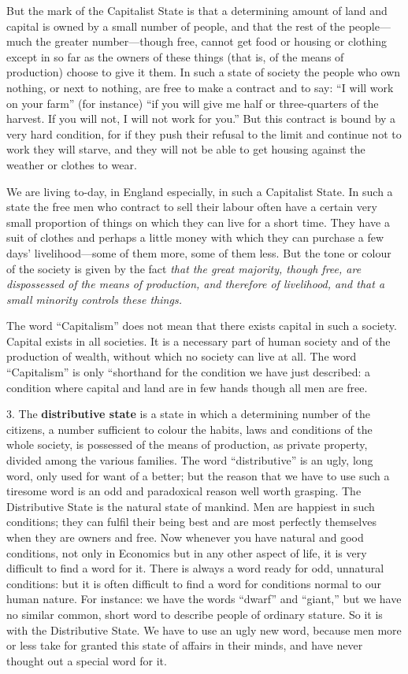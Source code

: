 \documentclass{book}
\begin{document}
But the mark of the Capitalist State is that a determining amount of land and capital is owned by a small number of people, and that the rest of the people—much the greater number—though free, cannot get food or housing or clothing except in so far as the owners of these things (that is, of the means of production) choose to give it them. In such a state of society the people who own nothing, or next to nothing, are free to make a contract and to say: “I will work on your farm” (for instance) “if you will give me half or three-quarters of the harvest. If you will not, I will not work for you.” But this contract is bound by a very hard condition, for if they push their refusal to the limit and continue not to work they will starve, and they will not be able to get housing against the weather or clothes to wear.

We are living to-day, in England especially, in such a Capitalist State. In such a state the free men who contract to sell their labour often have a certain very small proportion of things on which they can live for a short time. They have a suit of clothes and perhaps a little money with which they can purchase a few days’ livelihood—some of them more, some of them less. But the tone or colour of the society is given by the fact \emph{that the great majority, though free, are dispossessed of the means of production, and therefore of livelihood, and that a small minority controls these things.}

The word “Capitalism” does not mean that there exists capital in such a society. Capital exists in all societies. It is a necessary part of human society and of the production of wealth, without which no society can live at all. The word “Capitalism” is only “shorthand for the condition we have just described: a condition where capital and land are in few hands though all men are free.

3. The \textbf{distributive state} is a state in which a determining number of the citizens, a number sufficient to colour the habits, laws and conditions of the whole society, is possessed of the means of production, as private property, divided among the various families. The word “distributive” is an ugly, long word, only used for want of a better; but the reason that we have to use such a tiresome word is an odd and paradoxical reason well worth grasping. The Distributive State is the natural state of mankind. Men are happiest in such conditions; they can fulfil their being best and are most perfectly themselves when they are owners and free. Now whenever you have natural and good conditions, not only in Economics but in any other aspect of life, it is very difficult to find a word for it. There is always a word ready for odd, unnatural conditions: but it is often difficult to find a word for conditions normal to our human nature. For instance: we have the words “dwarf” and “giant,” but we have no similar common, short word to describe people of ordinary stature. So it is with the Distributive State. We have to use an ugly new word, because men more or less take for granted this state of affairs in their minds, and have never thought out a special word for it.
\end{document}
